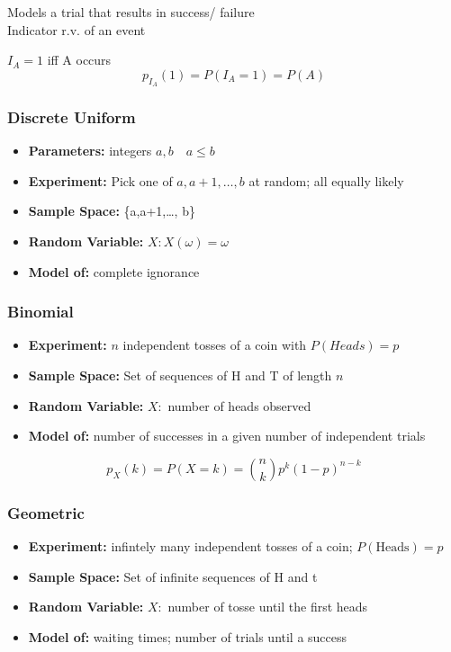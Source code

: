 \documentclass{article}
\begin{document}
Models a trial that results in success/ failure
\\

Indicator r.v. of an event

\(I_A = 1\) iff A occurs
\[
p_{I_A}(1) = P(I_A = 1) = P(A)
\]


\subsubsection*{Discrete Uniform}
\begin{itemize}
    \item \textbf{Parameters:} integers \(a,b \quad a \leq b\)
    \item \textbf{Experiment:} Pick one of \(a,a+1,\dots,b\) at random; all equally likely
    \item \textbf{Sample Space:} \{a,a+1,\dots, b\}
    \item \textbf{Random Variable:} \(X: X(\omega)= \omega\)
    \item \textbf{Model of:} complete ignorance
\end{itemize}

\subsubsection*{Binomial}
\begin{itemize}
    \item \textbf{Experiment:} \(n\) independent tosses of a coin with \(P(Heads) = p\)
    \item \textbf{Sample Space:} Set of sequences of H and T of length \(n\)
    \item \textbf{Random Variable:} \(X:\) number of heads observed
    \item \textbf{Model of:} number of successes in a given number of independent trials
\end{itemize}

\[
p_X(k) = P(X=k) = \binom{n}{k}p^k(1-p)^{n-k}
\]

\subsubsection*{Geometric}

\begin{itemize}
    \item \textbf{Experiment:} infintely many independent tosses of a coin; \(P(\text{Heads}) = p\)
    \item \textbf{Sample Space:} Set of infinite sequences of H and t
    \item \textbf{Random Variable:} \(X:\) number of tosse until the first heads
    \item \textbf{Model of:} waiting times; number of trials until a success
\end{itemize}
\end{document}
